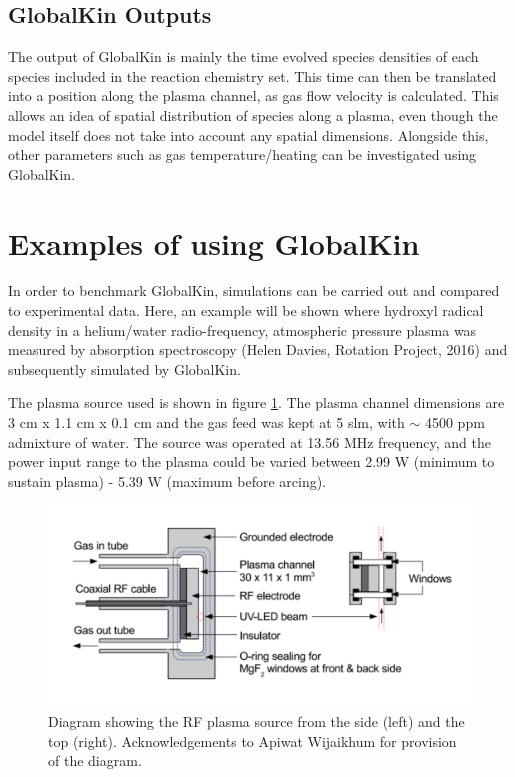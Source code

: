 \documentclass[11pt, oneside]{article}   	%
\begin{document}
\subsection{GlobalKin Outputs}
The output of GlobalKin is mainly the time evolved species densities of each species included in the reaction chemistry set.
This time can then be translated into a position along the plasma channel, as gas flow velocity is calculated.
This allows an idea of spatial distribution of species along a plasma, even though the model itself does not take into account any spatial dimensions. Alongside this, other parameters such as gas temperature/heating can be investigated using GlobalKin.

\section{Examples of using GlobalKin}
In order to benchmark GlobalKin, simulations can be carried out and compared to experimental data.
Here, an example will be shown where hydroxyl radical density in a helium/water radio-frequency, atmospheric pressure plasma was measured by absorption spectroscopy (Helen Davies, Rotation Project, 2016) and subsequently simulated by GlobalKin.

The plasma source used is shown in figure \ref{PlasmafromApiwat}.
The plasma channel dimensions are 3 cm x 1.1 cm x 0.1 cm and the gas feed was kept at 5 slm, with $\sim$ 4500 ppm admixture of water.
The source was operated at 13.56 MHz frequency, and the power input range to the plasma could be varied between 2.99 W (minimum to sustain plasma) - 5.39 W (maximum before arcing).

\begin{figure}
\includegraphics[width=\textwidth]{Figures/PlasmafromApiwat}
\caption{Diagram showing the RF plasma source from the side (left) and the top (right). Acknowledgements to Apiwat Wijaikhum for provision of the diagram.}
\label{PlasmafromApiwat}
\end{figure}
\end{document}
